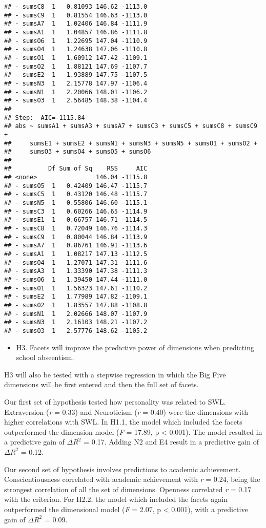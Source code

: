 \documentclass[,man,floatsintext]{apa6}
\providecommand{\tightlist}{%
  \setlength{\itemsep}{0pt}\setlength{\parskip}{0pt}}
\begin{document}
\begin{verbatim}
## - sumsC8  1   0.81093 146.62 -1113.0
## - sumsC9  1   0.81554 146.63 -1113.0
## - sumsA7  1   1.02406 146.84 -1111.9
## - sumsA1  1   1.04857 146.86 -1111.8
## - sumsO6  1   1.22695 147.04 -1110.9
## - sumsO4  1   1.24638 147.06 -1110.8
## - sumsO1  1   1.60912 147.42 -1109.1
## - sumsO2  1   1.88121 147.69 -1107.7
## - sumsE2  1   1.93889 147.75 -1107.5
## - sumsN3  1   2.15778 147.97 -1106.4
## - sumsN1  1   2.20066 148.01 -1106.2
## - sumsO3  1   2.56485 148.38 -1104.4
## 
## Step:  AIC=-1115.84
## abs ~ sumsA1 + sumsA3 + sumsA7 + sumsC3 + sumsC5 + sumsC8 + sumsC9 + 
##     sumsE1 + sumsE2 + sumsN1 + sumsN3 + sumsN5 + sumsO1 + sumsO2 + 
##     sumsO3 + sumsO4 + sumsO5 + sumsO6
## 
##          Df Sum of Sq    RSS     AIC
## <none>                146.04 -1115.8
## - sumsO5  1   0.42409 146.47 -1115.7
## - sumsC5  1   0.43120 146.48 -1115.7
## - sumsN5  1   0.55806 146.60 -1115.1
## - sumsC3  1   0.60266 146.65 -1114.9
## - sumsE1  1   0.66757 146.71 -1114.5
## - sumsC8  1   0.72049 146.76 -1114.3
## - sumsC9  1   0.80044 146.84 -1113.9
## - sumsA7  1   0.86761 146.91 -1113.6
## - sumsA1  1   1.08217 147.13 -1112.5
## - sumsO4  1   1.27071 147.31 -1111.6
## - sumsA3  1   1.33390 147.38 -1111.3
## - sumsO6  1   1.39450 147.44 -1111.0
## - sumsO1  1   1.56323 147.61 -1110.2
## - sumsE2  1   1.77989 147.82 -1109.1
## - sumsO2  1   1.83557 147.88 -1108.8
## - sumsN1  1   2.02666 148.07 -1107.9
## - sumsN3  1   2.16103 148.21 -1107.2
## - sumsO3  1   2.57776 148.62 -1105.2
\end{verbatim}

\begin{itemize}
\tightlist
\item
  H3. Facets will improve the predictive power of dimensions when
  predicting school abseentism.
\end{itemize}

H3 will also be tested with a stepwise regression in which the Big Five
dimensions will be first entered and then the full set of facets.

Our first set of hypothesis tested how personality was related to SWL.
Extraversion (\emph{r} = 0.33) and Neuroticism (\emph{r} = 0.40) were
the dimensions with higher correlations with SWL. In H1.1, the model
which included the facets outperformed the dimension model (\emph{F} =
17.89, p \textless{} 0.001). The model resulted in a predictive gain of
\(\Delta R^2\) = 0.17. Adding N2 and E4 result in a predictive gain of
\(\Delta R^2\) = 0.12.

Our second set of hypothesis involves predictions to academic
achievement. Conscientiousness correlated with academic achievement with
\emph{r} = 0.24, being the strongest correlation of all the set of
dimensions. Openness correlated \emph{r} = 0.17 with the criterion. For
H2.2, the model which included the facets again outperformed the
dimensional model (\emph{F} = 2.07, p \textless{} 0.001), with a
predictive gain of \(\Delta R^2\) = 0.09.
\end{document}
